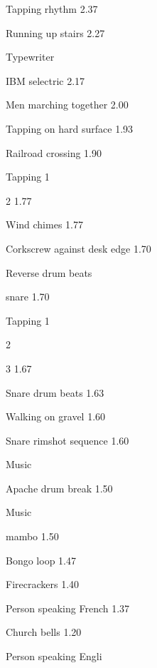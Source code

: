 \documentclass{sig-alternate-05-2015}
\begin{document}
{ Tapping rhythm
2.37 

 Running up stairs
2.27 

 Typewriter 

 IBM selectric
2.17 

 Men marching together
2.00 

 Tapping on hard surface
1.93 

 Railroad crossing
1.90 

 Tapping 1

2
1.77 

 Wind chimes
1.77 

 Corkscrew against desk edge
1.70 

 Reverse drum beats 

 snare
1.70 

 Tapping  1

2

3
1.67 

 Snare drum beats
1.63 

 Walking on gravel
1.60 

 Snare rimshot sequence
1.60 

 Music 

 Apache drum break
1.50 

 Music 

 mambo
1.50 

 Bongo loop
1.47 

 Firecrackers
1.40 

 Person speaking French
1.37 

 Church bells
1.20 

 Person speaking Engli
}







\end{document}
